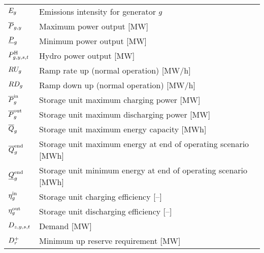 \documentclass{article}
\begin{document}
\begin{longtable}{ p{}  p{}}
		$E_{g}$ & Emissions intensity for generator $g$\\
		$\overline{P}_{g,y}$ & Maximum power output [MW]\\
		$\underline{P}_{g}$ & Minimum power output [MW]\\
		$P^{\mathrm{H}}_{g,y,s,t}$ & Hydro power output [MW]\\
		$RU_{g}$ & Ramp rate up (normal operation) [MW/h]\\
		$RD_{g}$ & Ramp down up (normal operation) [MW/h]\\
		$\overline{P}^{\mathrm{in}}_{g}$ & Storage unit maximum charging power [MW]\\
		$\overline{P}^{\mathrm{out}}_{g}$ & Storage unit maximum discharging power [MW]\\
		$\overline{Q}_{g}$ & Storage unit maximum energy capacity [MWh]\\
		$\overline{Q}^{\mathrm{end}}_{g}$ & Storage unit maximum energy at end of operating scenario [MWh]\\
		$\underline{Q}^{\mathrm{end}}_{g}$ & Storage unit minimum energy at end of operating scenario [MWh]\\
		$\eta_{g}^{\mathrm{in}}$ & Storage unit charging efficiency [--]\\
		$\eta_{g}^{\mathrm{out}}$ & Storage unit discharging efficiency [--]\\
		$D_{z,y,s,t}$ & Demand [MW]\\
		$D^{+}_{r}$ & Minimum up reserve requirement [MW]\\

\end{longtable}
\end{document}
